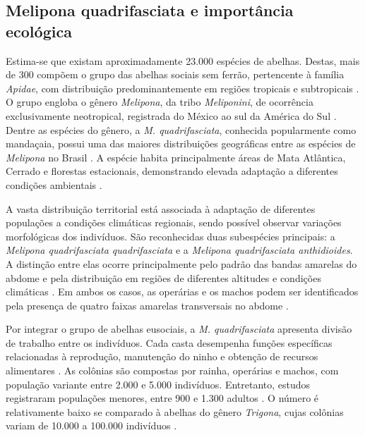 \documentclass[12pt]{unisenaiclass}
\begin{document}
\subsection{Melipona quadrifasciata e importância ecológica}
Estima-se que existam aproximadamente 23.000 espécies de abelhas. Destas, mais de 300 compõem o grupo das abelhas sociais sem ferrão, pertencente à família \textit{Apidae}, com distribuição predominantemente em regiões tropicais e subtropicais \cite{carvalhozilse2011meliponicultura}. O grupo engloba o gênero \textit{Melipona}, da tribo \textit{Meliponini}, de ocorrência exclusivamente neotropical, registrada do México ao sul da América do Sul \cite{kerr1948geografia,pedro2014stingless}. Dentre as espécies do gênero, a \textit{M. quadrifasciata}, conhecida popularmente como mandaçaia, possui uma das maiores distribuições geográficas entre as espécies de \textit{Melipona} no Brasil \cite{mourekerr1950distribuicao}. A espécie habita principalmente áreas de Mata Atlântica, Cerrado e florestas estacionais, demonstrando elevada adaptação a diferentes condições ambientais \cite{melo2009colorpattern}.

A vasta distribuição territorial está associada à adaptação de diferentes populações a condições climáticas regionais, sendo possível observar variações morfológicas dos indivíduos. São reconhecidas duas subespécies principais: a \textit{Melipona quadrifasciata quadrifasciata} e a \textit{Melipona quadrifasciata anthidioides}. A distinção entre elas ocorre principalmente pelo padrão das bandas amarelas do abdome e pela distribuição em regiões de diferentes altitudes e condições climáticas \cite{mourekerr1950distribuicao,melo1987listras}. Em ambos os casos, as operárias e os machos podem ser identificados pela presença de quatro faixas amarelas transversais no abdome \cite{melo1987listras}.

Por integrar o grupo de abelhas eusociais, a \textit{M. quadrifasciata} apresenta divisão de trabalho entre os indivíduos. Cada casta desempenha funções específicas relacionadas à reprodução, manutenção do ninho e obtenção de recursos alimentares \cite{michener2007bees}. As colônias são compostas por rainha, operárias e machos, com população variante entre 2.000 e 5.000 indivíduos. Entretanto, estudos registraram populações menores, entre 900 e 1.300 adultos \cite{brito2013caste,faquinello2013correlacao}. O número é relativamente baixo se comparado à abelhas do gênero \textit{Trigona}, cujas colônias variam de 10.000 a 100.000 indivíduos \cite{michener2007bees}.
\end{document}
